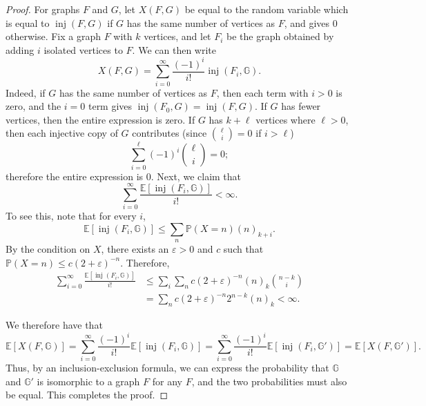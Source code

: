 \documentclass{amsart}
\numberwithin{equation}{section}
\numberwithin{figure}{section}
\theoremstyle{definition}
\theoremstyle{remark}
\DeclareMathOperator{\inj}{inj}
\newcommand{\EE}{\mathbb{E}}
\newcommand{\PP}{\mathbb{P}}
\begin{document}
\begin{proof}
For graphs $F$ and $G$, let $X(F,G)$ be equal to the random variable which is
equal to $\inj(F,G)$ if $G$ has the same number of vertices as $F$, and gives
$0$ otherwise. Fix a graph $F$ with $k$ vertices, and let $F_i$ be the graph
obtained by adding $i$ isolated vertices to $F$. We can then write
\[X(F,G)=\sum_{i=0}^\infty \frac{(-1)^i}{i!} \inj(F_i,\mathbb{G}).
\]
Indeed, if $G$ has the same number of vertices as $F$, then each term with
$i>0$ is zero, and the $i=0$ term gives $\inj(F_0,G)=\inj(F,G)$. If $G$ has
fewer vertices, then the entire expression is zero. If $G$ has $k+\ell$
vertices where $\ell>0$, then each injective copy of $G$ contributes (since
$\binom{\ell}{i}=0$ if $i>\ell$)
\[\sum_{i=0}^{\ell} (-1)^i \binom{\ell}{i}=0
;\]
therefore the entire expression is $0$.
Next, we claim that
\[\sum_{i=0}^\infty \frac{\EE[\inj(F_i,\mathbb{G})]}{i!}<\infty.
\]
To see this, note that for every $i$,
\[\EE[\inj(F_i,\mathbb{G})]\le \sum_n \PP(X=n) (n)_{k+i}.
\]
By the condition on $X$, there exists an $\varepsilon>0$ and $c$ such that
$\PP(X=n) \le c (2+\varepsilon)^{-n}$. Therefore,
\begin{align*}
\sum_{i=0}^\infty \frac{\EE[\inj(F_i,\mathbb{G})]}{i!} &\le \sum_i \sum_n c(2+\varepsilon)^{-n}(n)_{k}\binom{n-k}{i}\\
&=\sum_n c(2+\varepsilon)^{-n}2^{n-k}(n)_k<\infty.
\end{align*}

We therefore have that
\[\EE[X(F,\mathbb{G})]=\sum_{i=0}^\infty \frac{(-1)^i}{i!} \EE[\inj(F_i,\mathbb{G})]=\sum_{i=0}^\infty \frac{(-1)^i}{i!} \EE[\inj(F_i,\mathbb{G'})]=\EE[X(F,\mathbb{G'})]
.\] Thus, by an inclusion-exclusion formula, we can express the probability that
$\mathbb{G}$ and $\mathbb{G}'$ is isomorphic to a graph $F$ for any $F$, and
the two probabilities must also be equal. This completes the proof.
\end{proof}
\end{document}
